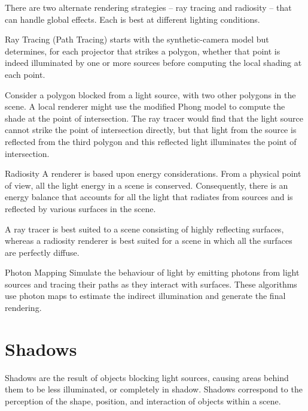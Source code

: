 \documentclass[../COS3712_Notes.tex]{subfiles}
\begin{document}
      There are two alternate rendering strategies -- ray tracing and radiosity --
      that can handle global effects.
      Each is best at different lighting conditions.

      \begin{definition}{Ray Tracing (Path Tracing)}
         starts with the synthetic-camera model but determines,
        for each projector that strikes a polygon,
        whether that point is indeed illuminated by one or more sources
        before computing the local shading at each point.

        Consider a polygon blocked from a light source, with two other polygons in the scene.
        A local renderer might use the modified Phong model to compute the shade
        at the point of intersection.
        The ray tracer would find that the light source cannot strike the point of intersection
        directly, but that light from the source is reflected from the third polygon
        and this reflected light illuminates the point of intersection.
      \end{definition}

      \begin{definition}{Radiosity}
        A  renderer is based upon energy considerations.
        From a physical point of view, all the light energy in a scene is conserved.
        Consequently, there is an energy balance that accounts for all the light
        that radiates from sources and is reflected by various surfaces in the scene.
      \end{definition}

      A ray tracer is best suited to a scene consisting of highly reflecting surfaces,
      whereas a radiosity renderer is best suited for a scene in which all the surfaces
      are perfectly diffuse.

      \begin{definition}{Photon Mapping}
        Simulate the behaviour of light by emitting photons from light sources
        and tracing their paths as they interact with surfaces.
        These algorithms use photon maps to estimate the indirect illumination and generate
        the final rendering.
      \end{definition}

    \section{Shadows}
      Shadows are the result of objects blocking light sources, causing areas behind them
      to be less illuminated, or completely in shadow.
      Shadows correspond to the perception of the shape, position, and interaction of objects
      within a scene.
\end{document}
